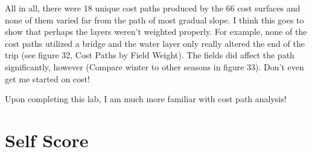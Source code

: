 \documentclass[article,12pt]{article}
\numberwithin{equation}{section}
\begin{document}
All in all, there were 18 unique cost paths produced by the 66 cost surfaces and none of them varied far from the path of most gradual slope. I think this goes to show that perhaps the layers weren't weighted properly. For example, none of the cost paths utilized a bridge and the water layer only really altered the end of the trip (see figure 32, Cost Paths by Field Weight). The fields did affect the path significantly, however (Compare winter to other seasons in figure 33). Don't even get me started on cost!

Upon completing this lab, I am much more familiar with cost path analysis!

\section*{Self Score}
\end{document}
